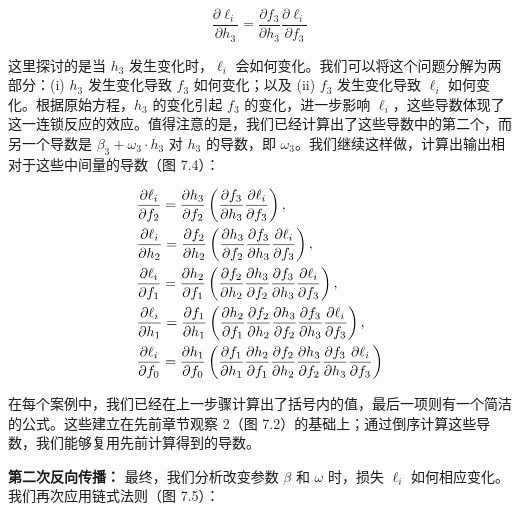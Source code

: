 \documentclass[lang=cn,newtx,10pt,scheme=chinese]{elegantbook}
\begin{document}
\begin{equation}
\frac{\partial \ell_i}{\partial h_3} = \frac{\partial f_3}{\partial h_3} \frac{\partial \ell_i}{\partial f_3} 
\end{equation}

这里探讨的是当 \(h_3\) 发生变化时，\(\ell_i\) 会如何变化。我们可以将这个问题分解为两部分：(i) \(h_3\) 发生变化导致 \(f_3\) 如何变化；以及 (ii) \(f_3\) 发生变化导致 \(\ell_i\) 如何变化。根据原始方程，\(h_3\) 的变化引起 \(f_3\) 的变化，进一步影响 \(\ell_i\)，这些导数体现了这一连锁反应的效应。值得注意的是，我们已经计算出了这些导数中的第二个，而另一个导数是 \(\beta_3 + \omega_3 \cdot h_3\) 对 \(h_3\) 的导数，即 \(\omega_3\)。我们继续这样做，计算出输出相对于这些中间量的导数（图 7.4）：

\begin{align}
&\frac{\partial \ell_i}{\partial f_2} = \frac{\partial h_3}{\partial f_2} \left( \frac{\partial f_3}{\partial h_3} \frac{\partial \ell_i}{\partial f_3} \right), \notag \\
&\frac{\partial \ell_i}{\partial h_2} = \frac{\partial f_2}{\partial h_2} \left( \frac{\partial h_3}{\partial f_2} \frac{\partial f_3}{\partial h_3} \frac{\partial \ell_i}{\partial f_3} \right), \notag \\
&\frac{\partial \ell_i}{\partial f_1} = \frac{\partial h_2}{\partial f_1} \left( \frac{\partial f_2}{\partial h_2} \frac{\partial h_3}{\partial f_2} \frac{\partial f_3}{\partial h_3} \frac{\partial \ell_i}{\partial f_3} \right), \notag \\
&\frac{\partial \ell_i}{\partial h_1} = \frac{\partial f_1}{\partial h_1} \left( \frac{\partial h_2}{\partial f_1} \frac{\partial f_2}{\partial h_2} \frac{\partial h_3}{\partial f_2} \frac{\partial f_3}{\partial h_3} \frac{\partial \ell_i}{\partial f_3} \right), \notag \\
&\frac{\partial \ell_i}{\partial f_0} = \frac{\partial h_1}{\partial f_0} \left( \frac{\partial f_1}{\partial h_1} \frac{\partial h_2}{\partial f_1} \frac{\partial f_2}{\partial h_2} \frac{\partial h_3}{\partial f_2} \frac{\partial f_3}{\partial h_3} \frac{\partial \ell_i}{\partial f_3} \right) 
\end{align}

在每个案例中，我们已经在上一步骤计算出了括号内的值，最后一项则有一个简洁的公式。这些建立在先前章节观察 2（图 7.2）的基础上；通过倒序计算这些导数，我们能够复用先前计算得到的导数。


\textbf{第二次反向传播：} 最终，我们分析改变参数 \(\beta\) 和 \(\omega\) 时，损失 \(\ell_i\) 如何相应变化。我们再次应用链式法则（图 7.5）：
\end{document}
